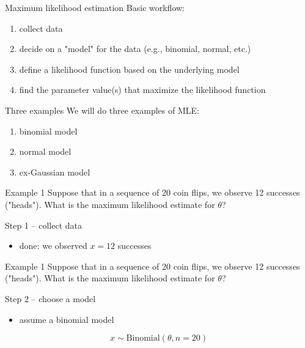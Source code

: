 \documentclass[presentation]{beamer}
\begin{document}
\begin{frame}[label=sec-10]{Maximum likelihood estimation}
Basic workflow:
\begin{enumerate}
\item collect data
\item decide on a "model" for the data (e.g., binomial, normal, etc.)
\item define a likelihood function based on the underlying model
\item find the parameter value(s) that \alert{maximize} the likelihood function
\end{enumerate}
\end{frame}


\begin{frame}[label=sec-11]{Three examples}
We will do three examples of MLE:
\begin{enumerate}
\item binomial model
\item normal model
\item ex-Gaussian model
\end{enumerate}
\end{frame}


\begin{frame}[label=sec-12]{Example 1}
Suppose that in a sequence of 20 coin flips, we observe 12 successes ("heads").  What is the maximum likelihood estimate for $\theta$?

\vspace{5mm}

Step 1 -- collect data
\begin{itemize}
\item done: we observed $x=12$ successes
\end{itemize}
\end{frame}

\begin{frame}[label=sec-13]{Example 1}
Suppose that in a sequence of 20 coin flips, we observe 12 successes ("heads").  What is the maximum likelihood estimate for $\theta$?

\vspace{5mm}

Step 2 -- choose a model
\begin{itemize}
\item assume a binomial model
\end{itemize}

\[
x \sim \text{Binomial}(\theta, n=20)
\]
\end{frame}
\end{document}
